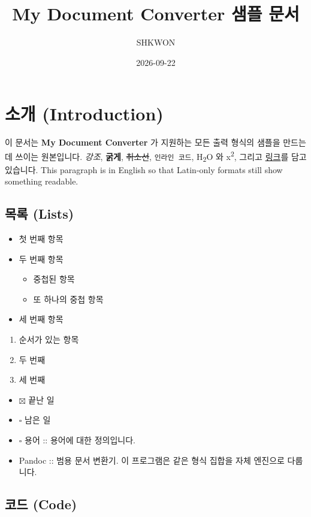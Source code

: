 \documentclass[11pt]{article}
\title{My Document Converter 샘플 문서}
\author{SHKWON}
\date{2026-09-22}
\begin{document}
\maketitle

\section*{소개 (Introduction)}\label{소개-introduction}

이 문서는 \textbf{My Document Converter} 가 지원하는 모든 출력 형식의 샘플을 만드는 데 쓰이는
원본입니다.
\emph{강조}, \textbf{굵게}, \sout{취소선}, \verb|인라인 코드|, H\textsubscript{2}O 와
x\textsuperscript{2}, 그리고
\href{https://example.com}{링크}를 담고 있습니다.
This paragraph is in English so that Latin-only formats still show
something readable.

\subsection*{목록 (Lists)}\label{목록-lists}

\begin{itemize}
\item 첫 번째 항목
\item 두 번째 항목
\begin{itemize}
\item 중첩된 항목
\item 또 하나의 중첩 항목
\end{itemize}
\item 세 번째 항목
\end{itemize}

\begin{enumerate}
\item 순서가 있는 항목
\item 두 번째
\item 세 번째
\end{enumerate}

\begin{itemize}
\item $\boxtimes$ 끝난 일
\item $\square$ 남은 일
\item $\square$ 용어 :: 용어에 대한 정의입니다.
\item Pandoc :: 범용 문서 변환기. 이 프로그램은 같은 형식 집합을 자체 엔진으로 다룹니다.
\end{itemize}

\subsection*{코드 (Code)}\label{코드-code}
\end{document}
